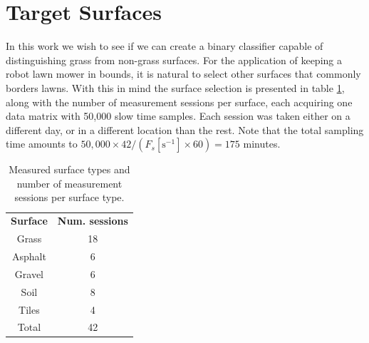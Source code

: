 \section{Target Surfaces}

In this work we wish to see if we can create a binary classifier capable of distinguishing grass from non-grass surfaces. For the application of keeping a robot lawn mower in bounds, it is natural to select other surfaces that commonly borders lawns. With this in mind the surface selection is presented in table \ref{tab:count}, along with the number of measurement sessions per surface, each acquiring one data matrix with 50,000 slow time samples. Each session was taken either on a different day, or in a different location than the rest. Note that the total sampling time amounts to $50,000\times42/(F_s [\text{s}^{-1}]\times60)=175$ minutes.

\begin{table}
\begin{center}
	\begin{tabular}{|c|c|}
		\hline
		\rowcolor{gray!150}\color{white}\textbf{Surface} & \color{white}\textbf{Num. sessions} \\
		 Grass & 18 \\
		 \rowcolor{gray!25} Asphalt & 6 \\
		 Gravel & 6 \\
		 \rowcolor{gray!25} Soil & 8 \\
		 Tiles & 4 \\ \hline
		 \rowcolor{gray!25} Total & 42 \\
		 \hline
	\end{tabular}
\end{center}
\caption{Measured surface types and number of measurement sessions per surface type.}
\label{tab:count}
\end{table}


